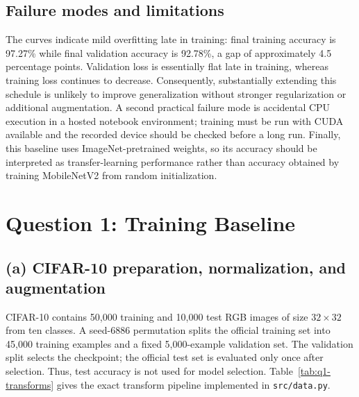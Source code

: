 \documentclass[12pt,a4paper]{article}
\begin{document}
\subsection{Failure modes and limitations}

The curves indicate mild overfitting late in training: final training accuracy
is 97.27\% while final validation accuracy is 92.78\%, a gap of approximately
4.5 percentage points. Validation loss is essentially flat late in training,
whereas training loss continues to decrease. Consequently,
substantially extending this schedule is unlikely to improve generalization
without stronger regularization or additional augmentation. A second practical
failure mode is accidental CPU execution in a hosted notebook environment;
training must be run with CUDA available and the recorded device should be
checked before a long run. Finally, this baseline uses ImageNet-pretrained
weights, so its accuracy should be interpreted as transfer-learning performance
rather than accuracy obtained by training MobileNetV2 from random
initialization.

























\fi

\section{Question 1: Training Baseline}

\subsection{(a) CIFAR-10 preparation, normalization, and augmentation}

CIFAR-10 contains 50,000 training and 10,000 test RGB images of size
$32\times32$ from ten classes. A seed-6886 permutation splits the official
training set into 45,000 training examples and a fixed 5,000-example validation
set. The validation split selects the checkpoint; the official test set is
evaluated only once after selection. Thus, test accuracy is not used for model
selection. Table~\ref{tab:q1-transforms} gives the exact transform pipeline
implemented in \texttt{src/data.py}.
\end{document}
